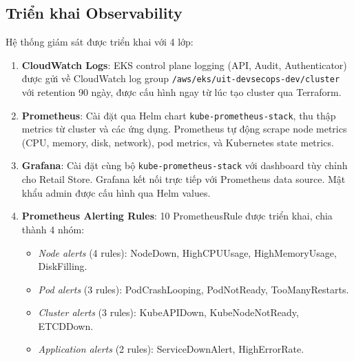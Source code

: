 \documentclass[13pt,a4paper,twoside]{extarticle}
\begin{document}
\subsection{Triển khai Observability}

Hệ thống giám sát được triển khai với 4 lớp:

\begin{enumerate}[leftmargin=*,nosep]
  \item \textbf{CloudWatch Logs}: EKS control plane logging (API, Audit, Authenticator) được gửi về CloudWatch log group \texttt{/aws/eks/uit-devsecops-dev/cluster} với retention 90 ngày, được cấu hình ngay từ lúc tạo cluster qua Terraform.
  \item \textbf{Prometheus}: Cài đặt qua Helm chart \texttt{kube-prometheus-stack}, thu thập metrics từ cluster và các ứng dụng. Prometheus tự động scrape node metrics (CPU, memory, disk, network), pod metrics, và Kubernetes state metrics.
  \item \textbf{Grafana}: Cài đặt cùng bộ \texttt{kube-prometheus-stack} với dashboard tùy chỉnh cho Retail Store. Grafana kết nối trực tiếp với Prometheus data source. Mật khẩu admin được cấu hình qua Helm values.
  \item \textbf{Prometheus Alerting Rules}: 10 PrometheusRule được triển khai, chia thành 4 nhóm:
  \begin{itemize}[nosep]
    \item \textit{Node alerts} (4 rules): NodeDown, HighCPUUsage, HighMemoryUsage, DiskFilling.
    \item \textit{Pod alerts} (3 rules): PodCrashLooping, PodNotReady, TooManyRestarts.
    \item \textit{Cluster alerts} (3 rules): KubeAPIDown, KubeNodeNotReady, ETCDDown.
    \item \textit{Application alerts} (2 rules): ServiceDownAlert, HighErrorRate.
  \end{itemize}
\end{enumerate}
\end{document}
